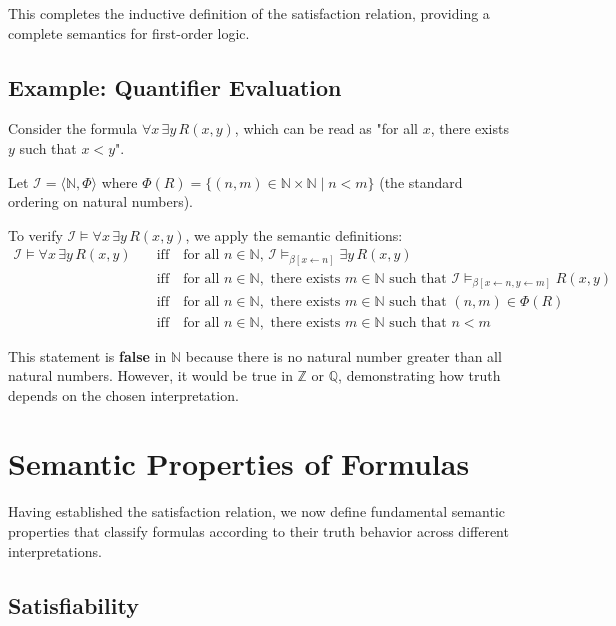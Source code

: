 \documentclass[11pt,a4paper]{article}
\theoremstyle{definition}
\theoremstyle{plain}
\theoremstyle{remark}
\newcommand{\N}{\mathbb{N}}
\begin{document}
This completes the inductive definition of the satisfaction relation, providing a complete semantics for first-order logic.

\subsection{Example: Quantifier Evaluation}

Consider the formula $\forall x \, \exists y \, R(x, y)$, which can be read as "for all $x$, there exists $y$ such that $x < y$".

Let $\mathcal{I} = \langle \N, \Phi \rangle$ where $\Phi(R) = \{(n, m) \in \N \times \N \mid n < m\}$ (the standard ordering on natural numbers).

To verify $\mathcal{I} \models \forall x \, \exists y \, R(x, y)$, we apply the semantic definitions:
\begin{align*}
\mathcal{I} \models \forall x \, \exists y \, R(x, y) 
&\quad \text{iff} \quad \text{for all } n \in \N, \, \mathcal{I} \models_{\beta[x \leftarrow n]} \exists y \, R(x, y) \\
&\quad \text{iff} \quad \text{for all } n \in \N, \text{ there exists } m \in \N \text{ such that } \mathcal{I} \models_{\beta[x \leftarrow n, y \leftarrow m]} R(x, y) \\
&\quad \text{iff} \quad \text{for all } n \in \N, \text{ there exists } m \in \N \text{ such that } (n, m) \in \Phi(R) \\
&\quad \text{iff} \quad \text{for all } n \in \N, \text{ there exists } m \in \N \text{ such that } n < m
\end{align*}

This statement is \textbf{false} in $\N$ because there is no natural number greater than all natural numbers. However, it would be true in $\mathbb{Z}$ or $\mathbb{Q}$, demonstrating how truth depends on the chosen interpretation.

\section{Semantic Properties of Formulas}

Having established the satisfaction relation, we now define fundamental semantic properties that classify formulas according to their truth behavior across different interpretations.

\subsection{Satisfiability}
\end{document}
